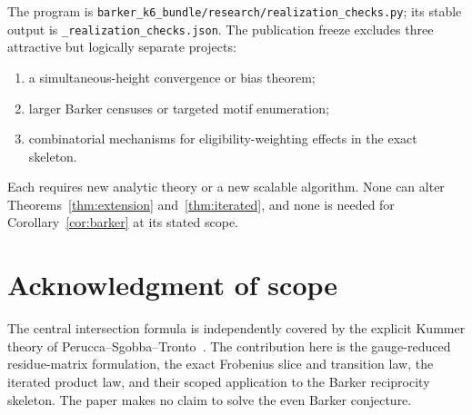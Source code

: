 \documentclass[11pt]{article}
\theoremstyle{definition}
\theoremstyle{remark}
\begin{document}
The program is
\texttt{barker\_k6\_bundle/research/realization\_checks.py}; its stable output
is \texttt{\_realization\_checks.json}.  The publication freeze excludes
three attractive but logically separate projects:
\begin{enumerate}
  \item a simultaneous-height convergence or bias theorem;
  \item larger Barker censuses or targeted motif enumeration;
  \item combinatorial mechanisms for eligibility-weighting effects in the
  exact skeleton.
\end{enumerate}
Each requires new analytic theory or a new scalable algorithm.  None can
alter Theorems~\ref{thm:extension} and~\ref{thm:iterated}, and none is
needed for Corollary~\ref{cor:barker} at its stated scope.

\section*{Acknowledgment of scope}

The central intersection formula is independently covered by the explicit
Kummer theory of Perucca--Sgobba--Tronto~\cite{PST}.  The contribution here
is the gauge-reduced residue-matrix formulation, the exact Frobenius slice
and transition law, the iterated product law, and their scoped application
to the Barker reciprocity skeleton.  The paper makes no claim to solve the
even Barker conjecture.
\end{document}
